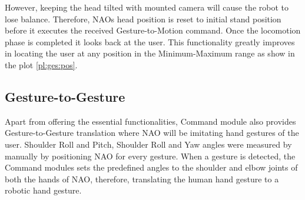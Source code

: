However, keeping the head tilted with mounted camera will cause the robot to lose balance. Therefore, NAOs head position is reset to initial stand position before it executes the received Gesture-to-Motion command. Once the locomotion phase is completed it looks back at the user. This functionality greatly improves in locating the user at any position in the Minimum-Maximum range as show in the plot \ref{pl:ges:pos}.

\subsection{Gesture-to-Gesture} Apart from offering the essential functionalities, Command module also provides Gesture-to-Gesture translation where NAO will be imitating hand gestures of the user.  Shoulder Roll and Pitch, Shoulder Roll and Yaw angles were measured by manually by positioning NAO for every gesture. When a gesture is detected, the Command modules sets the predefined angles to the shoulder and elbow joints of both the hands of NAO, therefore, translating the human hand gesture to a robotic hand gesture.

